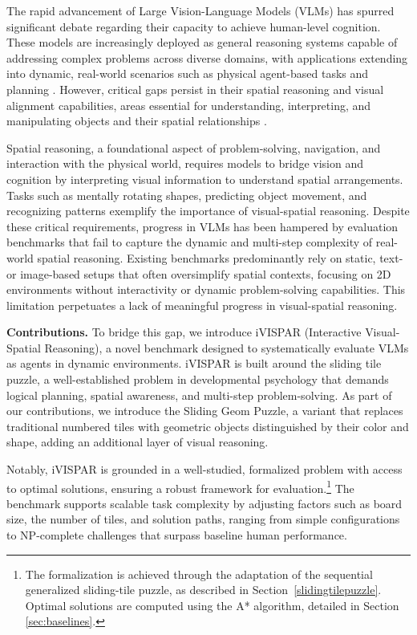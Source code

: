 The rapid advancement of Large Vision-Language Models (VLMs) has spurred significant debate regarding their capacity to achieve human-level cognition. These models are increasingly deployed as general reasoning systems capable of addressing complex problems across diverse domains, with applications extending into dynamic, real-world scenarios such as physical agent-based tasks and planning \cite{DBLP:journals/corr/abs-2406-14852, xi2023rise, zeng2023large}. However, critical gaps persist in their spatial reasoning and visual alignment capabilities, areas essential for understanding, interpreting, and manipulating objects and their spatial relationships \cite{DBLP:conf/emnlp/KamathHC23a, DBLP:journals/corr/abs-2405-17247, DBLP:journals/corr/abs-2411-00238}.

Spatial reasoning, a foundational aspect of problem-solving, navigation, and interaction with the physical world, requires models to bridge vision and cognition by interpreting visual information to understand spatial arrangements. Tasks such as mentally rotating shapes, predicting object movement, and recognizing patterns exemplify the importance of visual-spatial reasoning. Despite these critical requirements, progress in VLMs has been hampered by evaluation benchmarks that fail to capture the dynamic and multi-step complexity of real-world spatial reasoning. Existing benchmarks predominantly rely on static, text- or image-based setups that often oversimplify spatial contexts, focusing on 2D environments without interactivity or dynamic problem-solving capabilities. This limitation perpetuates a lack of meaningful progress in visual-spatial reasoning.

\textbf{Contributions.}\hspace{1em} To bridge this gap, we introduce iVISPAR (Interactive Visual-Spatial Reasoning), a novel benchmark designed to systematically evaluate VLMs as agents in dynamic environments. iVISPAR is built around the sliding tile puzzle, a well-established problem in developmental psychology that demands logical planning, spatial awareness, and multi-step problem-solving. As part of our contributions, we introduce the Sliding Geom Puzzle, a variant that replaces traditional numbered tiles with geometric objects distinguished by their color and shape, adding an additional layer of visual reasoning.

Notably, iVISPAR is grounded in a well-studied, formalized problem with access to optimal solutions, ensuring a robust framework for evaluation.\footnote{The formalization is achieved through the adaptation of the sequential generalized sliding-tile puzzle, as described in Section~\ref{slidingtilepuzzle}. Optimal solutions are computed using the A* algorithm, detailed in Section \ref{sec:baselines}.} The benchmark supports scalable task complexity by adjusting factors such as board size, the number of tiles, and solution paths, ranging from simple configurations to NP-complete challenges that surpass baseline human performance.

